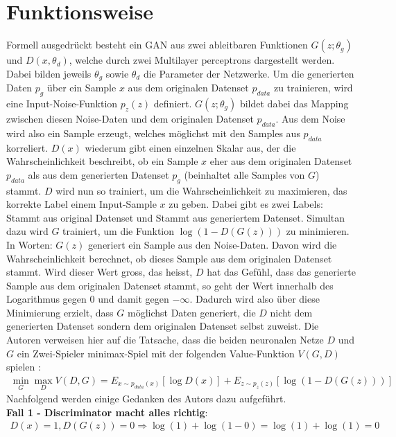 \section{Funktionsweise}
Formell ausgedrückt besteht ein \Gls{GAN} aus zwei ableitbaren Funktionen $G(z;\theta_g)$ und $D(x,\theta_d)$, welche durch zwei \Glspl{Multilayer perceptron}
dargestellt werden. Dabei bilden jeweils $\theta_g$ sowie $\theta_d$ die Parameter der Netzwerke. Um die generierten Daten $p_g$ über ein Sample $x$ aus
dem originalen Datenset $p_{data}$ zu trainieren, wird eine Input-Noise-Funktion $p_z(z)$ definiert. $G(z;\theta_g)$ bildet dabei das
Mapping zwischen diesen Noise-Daten und dem originalen Datenset $p_{data}$.
Aus dem Noise wird also ein Sample erzeugt, welches möglichst mit den Samples aus $p_{data}$ korreliert.
$D(x)$ wiederum gibt einen einzelnen Skalar aus, der die Wahrscheinlichkeit beschreibt, ob ein Sample $x$ eher aus dem originalen Datenset $p_{data}$
als aus dem generierten Datenset $p_g$ (beinhaltet alle Samples von $G$) stammt.
$D$ wird nun so trainiert, um die Wahrscheinlichkeit zu maximieren, das korrekte Label einem Input-Sample $x$ zu geben. Dabei gibt es zwei Labels:
\glqq Stammt aus original Datenset\grqq{} und \glqq Stammt aus generiertem Datenset\grqq{}. Simultan dazu wird $G$ trainiert, um die Funktion
$\log(1 - D(G(z)))$ zu minimieren\cite[p.~1]{8253599}. In Worten: $G(z)$ generiert ein Sample aus den Noise-Daten.
Davon wird die Wahrscheinlichkeit berechnet, ob dieses Sample aus dem originalen Datenset stammt. Wird dieser Wert gross, das heisst,
$D$ hat das Gefühl, dass das generierte Sample aus dem originalen Datenset stammt, so geht der Wert innerhalb des Logarithmus gegen 0 und damit gegen $-\infty$.
Dadurch wird also über diese Minimierung erzielt, dass $G$ möglichst Daten generiert, die $D$ nicht dem generierten Datenset sondern dem originalen Datenset selbst zuweist.
Die Autoren verweisen hier auf die Tatsache, dass die beiden neuronalen Netze $D$ und $G$ ein
Zwei-Spieler minimax-Spiel mit der folgenden Value-Funktion $V(G,D)$ spielen \cite[p.~2]{8253599}:
\begin{align}
    \min_{G} \max_{D} V(D, G) = E_{x\sim p_{data}(x)}[\log D(x)] + E_{z\sim p_z(z)}[\log(1 - D(G(z)))] \label{eq:1}
\end{align}
Nachfolgend werden einige Gedanken des Autors dazu aufgeführt.\\
\textbf{Fall 1 - Discriminator macht alles richtig}:
\begin{align}
    D(x) = 1, D(G(z)) = 0 \Rightarrow \log(1) + \log(1 - 0) = \log(1) + \log(1) = 0
\end{align}
